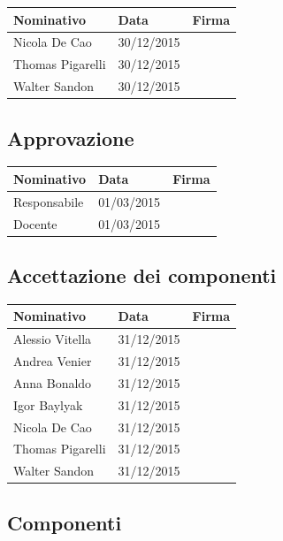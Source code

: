 \documentclass[12pt,a4paper]{article}
\begin{document}
\begin{tabular}{| l | l | l |}
    \hline
    Nominativo & Data & Firma \\ \hline
    Nicola De Cao & 30/12/2015 & \\ \hline
    Thomas Pigarelli & 30/12/2015 & \\ \hline
    Walter Sandon & 30/12/2015 & \\ \hline
\end{tabular}


\subsection{Approvazione}

\begin{tabular}{| l | l | l |}
    \hline
    Nominativo & Data & Firma \\ \hline
    Responsabile & 01/03/2015 & \\ \hline
    Docente & 01/03/2015 & \\ \hline
\end{tabular}

\subsection{Accettazione dei componenti}

\begin{tabular}{| l | l | l |}
    \hline
    Nominativo & Data & Firma \\ \hline
    Alessio Vitella & 31/12/2015 & \\ \hline
    Andrea Venier & 31/12/2015 & \\ \hline
    Anna Bonaldo & 31/12/2015 & \\ \hline
    Igor Baylyak & 31/12/2015 & \\ \hline
    Nicola De Cao & 31/12/2015 & \\ \hline
    Thomas Pigarelli & 31/12/2015 & \\ \hline
    Walter Sandon & 31/12/2015 & \\ \hline
\end{tabular}

\subsection{Componenti}
\end{document}
